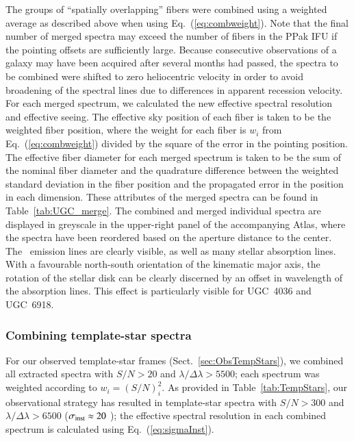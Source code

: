 \documentclass[traditabstract]{aa} %
\begin{document}
The groups of ``spatially overlapping'' fibers were combined using a weighted
average as described above when using Eq.~(\ref{eq:combweight}).  Note that
the final number of merged spectra may exceed the number of fibers in the PPak
IFU if the pointing offsets are sufficiently large. Because consecutive
observations of a galaxy may have been acquired after several months had passed,
the spectra to be combined were shifted to zero heliocentric velocity in order
to avoid broadening of the spectral lines due to differences in apparent
recession velocity. For each merged spectrum, we calculated the new effective
spectral resolution and effective seeing.  The effective sky position of each
fiber is taken to be the weighted fiber position, where the weight for each
fiber is $w_i$ from Eq.~(\ref{eq:combweight}) divided by the square of the
error in the pointing position. The effective fiber diameter for each merged
spectrum is taken to be the sum of the nominal fiber diameter and the quadrature
difference between the weighted standard deviation in the fiber position and the
propagated error in the position in each dimension. These attributes of the
merged spectra can be found in Table~\ref{tab:UGC_merge}.  
The combined and merged individual spectra are displayed in greyscale in the
upper-right panel of the accompanying Atlas, where the spectra have been reordered
based on the aperture distance to the center.
The \oiii\ emission lines are clearly
visible, as well as many stellar absorption lines. With a favourable north-south
orientation of the kinematic major axis, the rotation of the stellar disk can be
clearly discerned by an offset in wavelength of the absorption lines. This
effect is particularly visible for UGC~4036 and UGC~6918.


\subsubsection{Combining template-star spectra}
\label{sec:CombTemp}

For our observed template-star frames (Sect.~\ref{sec:ObsTempStars}), we
combined all extracted spectra with $S/N > 20$ and $\lambda/\Delta\lambda>5500$;
each spectrum was weighted according to $w_i=(S/N)_i^2$.  As provided in
Table~\ref{tab:TempStars}, our observational strategy has resulted in
template-star spectra with $S/N>300$ and $\lambda/\Delta\lambda>6500$
($\sigma_{\rm inst}\approx20$ \kms); the effective spectral resolution in each combined
spectrum is calculated using Eq.~(\ref{eq:sigmaInst}).
\end{document}
